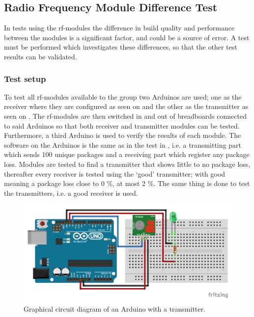 \subsection{Radio Frequency Module Difference Test} %
\label{cha:radio_frequency_module_difference_test}
In tests using the \gls{rf}-modules the difference in build quality and performance between the modules is a significant factor, and could be a source of error.
A test must be performed which investigates these differences, so that the other test results can be validated.

\subsubsection*{Test setup}
To test all \gls{rf}-modules available to the group two Arduinos are used; one as the receiver where they are configured as seen on  and the other as the transmitter as seen on .
The \gls{rf}-modules are then switched in and out of breadboards connected to said Arduinos so that both receiver and transmitter modules can be tested.
Furthermore, a third Arduino is used to verify the results of each module.
The software on the Arduinos is the same as in the test in , i.e. a transmitting part which sends 100 unique packages and a receiving part which register any package loss. 
Modules are tested to find a transmitter that shows little to no package loss, thereafter every receiver is tested using the \enquote*{good} transmitter; with good meaning a package loss close to 0 \%, at most 2 \%.
The same thing is done to test the transmitters, i.e. a good receiver is used.

\begin{figure}[h]
\centering
\includegraphics[width=\linewidth]{Figures/Fritzing/Transmitter.pdf} 
\caption{Graphical circuit diagram of an Arduino with a transmitter.}
\label{fig:Transmitter}   
\end{figure}

